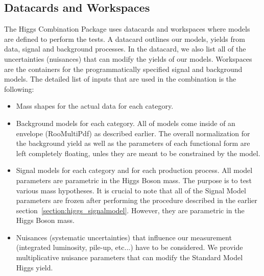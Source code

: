 \subsection{Datacards and Workspaces}
The Higgs Combination Package uses datacards and workspaces where models
are defined to perform the tests. A datacard outlines our models, yields
from data, signal and background processes. In the datacard, we also list all
of the uncertainties (nuisances) that can modify the yields of our models.
Workspaces are the containers for the programmatically specified signal and
background models. The detailed list of inputs that are used in the combination
 is the following:
\begin{itemize}
    \item Mass shapes for the actual data for each category.
    \item Background models for each category. All of models come inside of an envelope (RooMultiPdf) as described earlier. The overall normalization for the background yield as well as the parameters of each functional form are left completely floating, unles they are meant to be constrained by the model.
    \item Signal models for each category and for each production process. All model parameters are parametric in the Higgs Boson mass. The purpose is to test various mass hypotheses. It is crucial to note that all of the Signal Model parameters are frozen after performing the procedure described in the earlier section~\ref{section:higgs_signalmodel}. However, they are parametric in the Higgs Boson mass.
    \item Nuisances (systematic uncertainties) that influence our measurement (integrated luminosity, pile-up, etc...) have to be considered. We provide multiplicative nuisance parameters that can modify the Standard Model Higgs yield.
\end{itemize}


